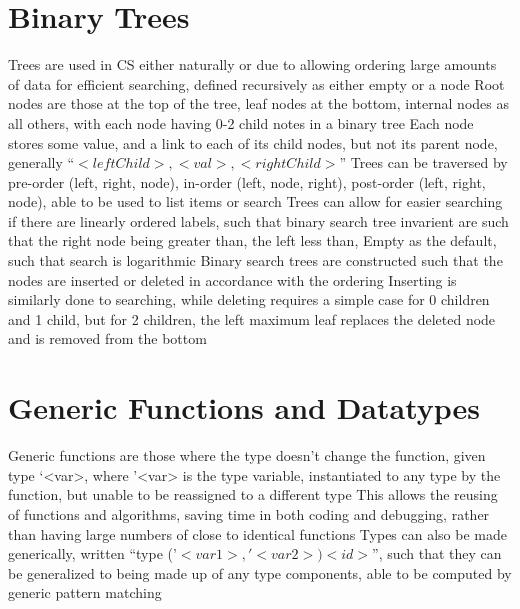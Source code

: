 \documentclass[11 pt, twoside]{article}
\newenvironment{outline*}
{
	\begin{outline}[enumerate]
	}
	{\end{outline}
}
\begin{document}
\section{Binary Trees}
\begin{outline*}
\1 Trees are used in CS either naturally or due to allowing ordering large amounts of data for efficient searching, defined recursively as either empty or a node
	\2 Root nodes are those at the top of the tree, leaf nodes at the bottom, internal nodes as all others, with each node having 0-2 child notes in a binary tree
	\2 Each node stores some value, and a link to each of its child nodes, but not its parent node, generally ``$<leftChild>, <val>, <rightChild>$''
	\2 Trees can be traversed by pre-order (left, right, node), in-order (left, node, right), post-order (left, right, node), able to be used to list items or search
\1 Trees can allow for easier searching if there are linearly ordered labels, such that binary search tree invarient are such that the right node being greater than, the left less than, Empty as the default, such that search is logarithmic
	\2 Binary search trees are constructed such that the nodes are inserted or deleted in accordance with the ordering
	\2 Inserting is similarly done to searching, while deleting requires a simple case for 0 children and 1 child, but for 2 children, the left maximum leaf replaces the deleted node and is removed from the bottom
\end{outline*}
\section{Generic Functions and Datatypes}
\begin{outline*}
\1 Generic functions are those where the type doesn't change the function, given type `<var>, where '<var> is the type variable, instantiated to any type by the function, but unable to be reassigned to a different type
	\2 This allows the reusing of functions and algorithms, saving time in both coding and debugging, rather than having large numbers of close to identical functions
	\2 Types can also be made generically, written ``type ('$<var1>, '<var2>) <id>$'', such that they can be generalized to being made up of any type components, able to be computed by generic pattern matching
\end{outline*}
\end{document}

